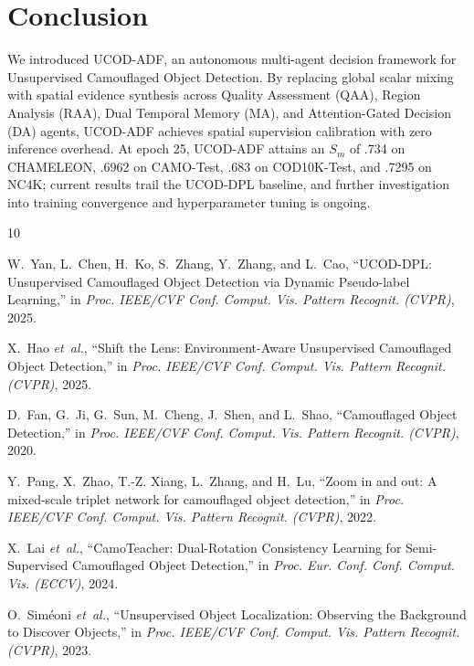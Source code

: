 \documentclass[journal,twoside,web]{IEEEtran}
\newcommand{\methodname}{UCOD-ADF}
\begin{document}
\begin{table}[t]
\section{Conclusion}
\label{sec:conclusion}

We introduced \methodname{}, an autonomous multi-agent decision framework for Unsupervised Camouflaged Object Detection. By replacing global scalar mixing with spatial evidence synthesis across Quality Assessment (QAA), Region Analysis (RAA), Dual Temporal Memory (MA), and Attention-Gated Decision (DA) agents, \methodname{} achieves spatial supervision calibration with zero inference overhead. At epoch 25, \methodname{} attains an $S_m$ of .734 on CHAMELEON, .6962 on CAMO-Test, .683 on COD10K-Test, and .7295 on NC4K; current results trail the UCOD-DPL baseline, and further investigation into training convergence and hyperparameter tuning is ongoing.


\begin{thebibliography}{10}

W.~Yan, L.~Chen, H.~Ko, S.~Zhang, Y.~Zhang, and L.~Cao,
``{UCOD-DPL}: Unsupervised Camouflaged Object Detection via Dynamic Pseudo-label Learning,''
in \emph{Proc. IEEE/CVF Conf. Comput. Vis. Pattern Recognit. (CVPR)}, 2025.

X.~Hao \emph{et~al.},
``Shift the Lens: Environment-Aware Unsupervised Camouflaged Object Detection,''
in \emph{Proc. IEEE/CVF Conf. Comput. Vis. Pattern Recognit. (CVPR)}, 2025.

D.~Fan, G.~Ji, G.~Sun, M.~Cheng, J.~Shen, and L.~Shao,
``Camouflaged Object Detection,''
in \emph{Proc. IEEE/CVF Conf. Comput. Vis. Pattern Recognit. (CVPR)}, 2020.

Y.~Pang, X.~Zhao, T.-Z. Xiang, L.~Zhang, and H.~Lu,
``Zoom in and out: A mixed-scale triplet network for camouflaged object detection,''
in \emph{Proc. IEEE/CVF Conf. Comput. Vis. Pattern Recognit. (CVPR)}, 2022.

X.~Lai \emph{et~al.},
``CamoTeacher: Dual-Rotation Consistency Learning for Semi-Supervised Camouflaged Object Detection,''
in \emph{Proc. Eur. Conf. Conf. Comput. Vis. (ECCV)}, 2024.

O.~Sim{\'e}oni \emph{et~al.},
``Unsupervised Object Localization: Observing the Background to Discover Objects,''
in \emph{Proc. IEEE/CVF Conf. Comput. Vis. Pattern Recognit. (CVPR)}, 2023.


\end{thebibliography}
\end{table}
\end{document}
